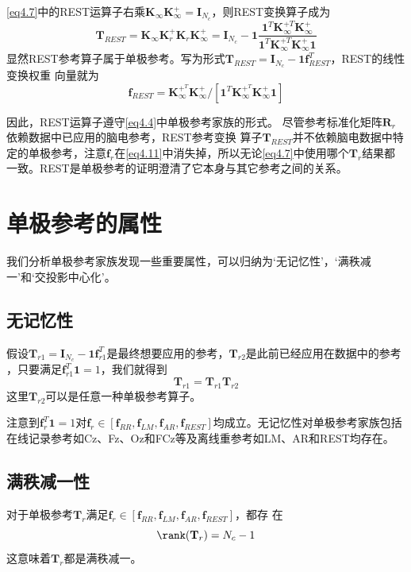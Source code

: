 \eqref{eq4.7}中的REST运算子右乘$\mathbf{K}_{\infty}\mathbf{K}_{\infty}^+=\mathbf{I}_{N_c}$，则REST变换算子成为
\begin{equation}\label{eq4.10}
\mathbf{T}_{REST}=\mathbf{K}_{\infty}\mathbf{K}_{r}^+\mathbf{K}_{r}\mathbf{K}_{\infty}^+=\mathbf{I}_{N_c}-\mathbf{1}\frac{\mathbf{1}^T\mathbf{K}_{\infty}^{+T}\mathbf{K}_{\infty}^+}{\mathbf{1}^T\mathbf{K}_{\infty}^{+T}\mathbf{K}_{\infty}^+\mathbf{1}}
\end{equation}
显然REST参考算子属于单极参考。写为形式$\mathbf{T}_{REST}=\mathbf{I}_{N_c}-\mathbf{1}\mathbf{f}_{REST}^T$，REST的线性变换权重
向量就为
\begin{equation}\label{eq4.11}
\mathbf{f}_{REST}=\mathbf{K}_{\infty}^{+^T}\mathbf{K}_{\infty}^+/{[\mathbf{1}^T\mathbf{K}_{\infty}^{+^T}\mathbf{K}_{\infty}^+\mathbf{1}]}
\end{equation}

因此，REST运算子遵守\eqref{eq4.4}中单极参考家族的形式。 尽管参考标准化矩阵$\mathbf{R}_r$依赖数据中已应用的脑电参考，REST参考变换
算子$\mathbf{T}_{REST}$并不依赖脑电数据中特定的单极参考，注意$\mathbf{f}_r$在\eqref{eq4.11}中消失掉，所以无论\eqref{eq4.7}中使用哪个$\mathbf{T}_r$结果都一致。REST是单极参考的证明澄清了它本身与其它参考之间的关系。

\section{单极参考的属性}
我们分析单极参考家族发现一些重要属性，可以归纳为‘无记忆性’，‘满秩减一’和‘交投影中心化’。

\subsection{无记忆性}
假设$\mathbf{T}_{r1}=\mathbf{I}_{N_c}-\mathbf{1f}_{r1}^T$是最终想要应用的参考，$\mathbf{T}_{r2}$是此前已经应用在数据中的参考
，只要满足$\mathbf{f}_{r1}^T\mathbf{1}=1$，我们就得到
\begin{equation}\label{eq4.12}
\mathbf{T}_{r1}=\mathbf{T}_{r1}\mathbf{T}_{r2}
\end{equation}
这里$\mathbf{T}_{r2}$可以是任意一种单极参考算子。

注意到$\mathbf{f}_r^T\mathbf{1}=1$对$\mathbf{f}_r\in{[\mathbf{f}_{RR},\mathbf{f}_{LM},\mathbf{f}_{AR},\mathbf{f}_{REST}]}$均成立。无记忆性对单极参考家族包括在线记录参考如Cz、Fz、Oz和FCz等及离线重参考如LM、AR和REST均存在。
\subsection{满秩减一性} 
对于单极参考$\mathbf{T}_r$满足$\mathbf{f}_r\in{[\mathbf{f}_{RR},\mathbf{f}_{LM},\mathbf{f}_{AR},\mathbf{f}_{REST}]}$，都存
在
\begin{equation}\label{eq4.13}
\rank(\mathbf{T}_r)=N_c-1
\end{equation}
这意味着$\mathbf{T}_r$都是满秩减一。

